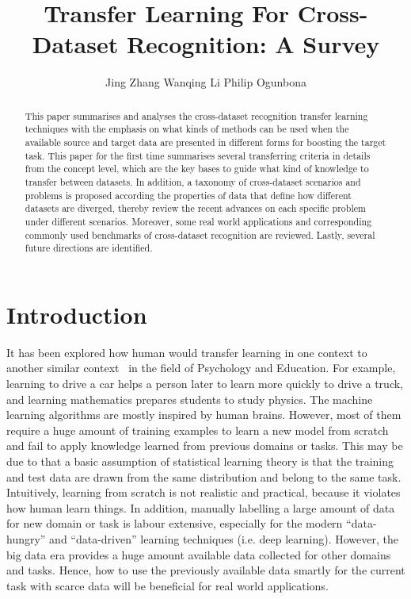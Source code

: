 \documentclass[prodmode]{acmsmall}  %
\begin{document}

\title{Transfer Learning For Cross-Dataset Recognition: A Survey}
\author{Jing Zhang
Wanqing Li
Philip Ogunbona
}

\begin{abstract}
This paper summarises and analyses the cross-dataset recognition transfer learning techniques with the emphasis on what kinds of methods can be used when the available source and target data are presented in different forms for boosting the target task. This paper for the first time summarises several transferring criteria in details from the concept level, which are the key bases to guide what kind of knowledge to transfer between datasets. In addition, a taxonomy of cross-dataset scenarios and problems is proposed according the properties of data that define how different datasets are diverged, thereby review the recent advances on each specific problem under different scenarios. Moreover, some real world applications and corresponding commonly used benchmarks of cross-dataset recognition are reviewed. Lastly, several future directions are identified.
\end{abstract}







\maketitle

\section{Introduction}
It has been explored how human would transfer learning in one context to another similar context~\cite{Woodworth1901,Perkins1992} in the field of Psychology and Education. For example, learning to drive a car helps a person later to learn more quickly to drive a truck, and learning mathematics prepares students to study physics. The machine learning algorithms are mostly inspired by human brains. However, most of them require a huge amount of training examples to learn a new model from scratch and fail to apply knowledge learned from previous domains or tasks. This may be due to that a basic assumption of statistical learning theory is that the training and test data are drawn from the same distribution and belong to the same task. Intuitively, learning from scratch is not realistic and practical, because it violates how human learn things. In addition, manually labelling a large amount of data for new domain or task is labour extensive, especially for the modern ``data-hungry'' and ``data-driven'' learning techniques (i.e. deep learning). However, the big data era provides a huge amount available data collected for other domains and tasks. Hence, how to use the previously available data smartly for the current task with scarce data will be beneficial for real world applications. 
\end{document}
